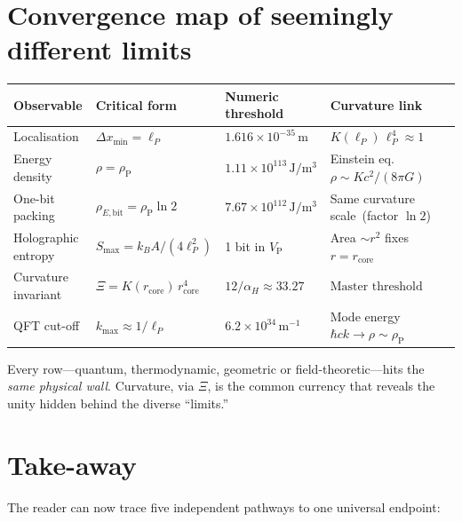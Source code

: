 \documentclass[a4paper, 12pt, oneside]{book}
\numberwithin{equation}{chapter}
\begin{document}
\section{Convergence map of seemingly different limits}
\begin{center}
\renewcommand{\arraystretch}{1.25}
\setlength{\tabcolsep}{6pt}
\begin{tabularx}{\textwidth}{l l X >{\raggedright\arraybackslash}p{4cm}}
\toprule
\textbf{Observable} & \textbf{Critical form} &
\textbf{Numeric threshold} & \textbf{Curvature link} \\ 
\midrule
Localisation & \(\Delta x_{\min}=\ell_P\) &
\(1.616\times10^{-35}\,\mathrm m\) &
\( K(\ell_P)\,\ell_P^{4}\!\approx\!1\) \\[3pt]

Energy density & \(\rho=\rho_{\mathrm P}\) &
\(1.11\times10^{113}\,\mathrm{J/m^{3}}\) &
Einstein eq.\ \( \rho\sim K c^{2}/(8\pi G) \) \\[3pt]

One-bit packing & \(\rho_{E,\text{bit}}=\rho_{\mathrm P}\ln2\) &
\(7.67\times10^{112}\,\mathrm{J/m^{3}}\) &
Same curvature scale~(factor \(\ln2\)) \\[3pt]

Holographic entropy & \(S_{\max}=k_BA/(4\ell_P^{2})\) &
1 bit in \(V_{\mathrm P}\) &
Area \(\sim r^{2}\) fixes \(r=r_{\text{core}}\) \\[3pt]

Curvature invariant & \(\Xi=K(r_{\text{core}})\,r_{\text{core}}^{4}\) &
\(12/\alpha_H\approx33.27\) &
\(\boxed{\text{Master threshold}}\) \\[3pt]

QFT cut-off & \(k_{\max}\approx1/\ell_P\) &
\(6.2\times10^{34}\,\mathrm{m^{-1}}\) &
Mode energy \(\hbar ck\to\rho\sim\rho_{\mathrm P}\) \\ 
\bottomrule
\end{tabularx}
\end{center}

\noindent
Every row—quantum, thermodynamic, geometric or field-theoretic—hits
the \emph{same physical wall}.  Curvature, via \(\Xi\), is the common
currency that reveals the unity hidden behind the diverse “limits.”

\section{Take-away}
The reader can now trace five independent pathways to one universal
endpoint:
\end{document}
